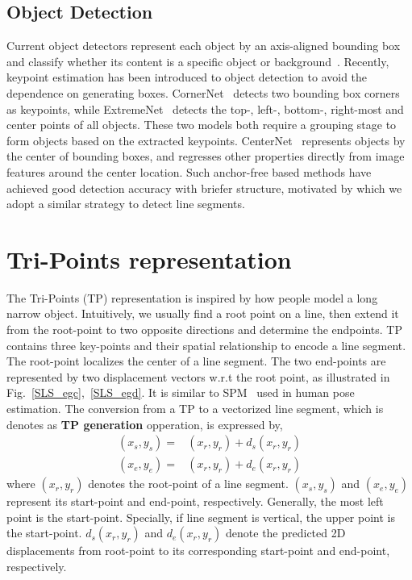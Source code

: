 \documentclass[runningheads]{llncs}
\begin{document}
\subsection{Object Detection}
 Current object detectors represent each object by an axis-aligned bounding box and classify whether its content is a specific object or background~\cite{FRcnn, SSD}. Recently, keypoint estimation has been introduced to object detection to avoid the dependence on generating boxes. CornerNet~\cite{CornerNet} detects two bounding box corners as keypoints, while ExtremeNet~\cite{ExtremeNet} detects the top-, left-, bottom-, right-most and center points of all objects. These two models both require a grouping stage to form objects based on the extracted keypoints. CenterNet~\cite{CenterNet} represents objects by the center of bounding boxes, and regresses other properties directly from image features around the center location. Such anchor-free based methods have achieved good detection accuracy with 
briefer structure, motivated by which we adopt a similar strategy to detect line segments.


\section{Tri-Points representation}
The Tri-Points (TP) representation is inspired by how people model a long narrow object. Intuitively, we usually find a root point on a line, then extend it from the root-point to two opposite directions and determine the endpoints. TP contains three key-points and their spatial relationship to encode a line segment. The root-point localizes the center of a line segment. The two end-points are represented by two displacement vectors w.r.t the root point, as illustrated in Fig.~\ref{SLS_egc},~\ref{SLS_egd}.
It is similar to SPM~\cite{SPM} used in human pose estimation.
The conversion from a TP to a vectorized line segment, which is denotes as \textbf{TP generation} opperation, is expressed by, \begin{align}
(x_{s}, y_{s}) =&(x_{r}, y_{r}) + d_s(x_r, y_r) \nonumber\\
(x_{e}, y_{e}) =&(x_{r}, y_{r}) + d_e(x_r, y_r)
\label{SLS_eq}
\end{align}
where $(x_{r}, y_{r})$ denotes the root-point of a line segment. $(x_{s}, y_{s})$ and $(x_{e}, y_{e})$ represent its start-point and end-point, respectively. Generally, the most left point is the start-point. Specially, if line segment is vertical, the upper point is the start-point. $d_s(x_r, y _r)$ and $d_e(x_r, y _r)$ denote the predicted 2D displacements from root-point to its corresponding start-point and end-point, respectively.
\end{document}
